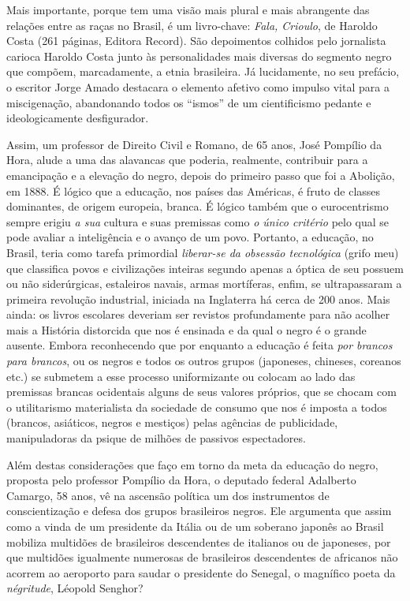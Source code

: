 \documentclass[
  letterpaper,
  DIV=11,
  numbers=noendperiod]{scrreprt}
\begin{document}
Mais importante, porque tem uma visão mais plural e mais abrangente das
relações entre as raças no Brasil, é um livro-chave: \emph{Fala,
Crioulo}, de Haroldo Costa (261 páginas, Editora Record). São
depoimentos colhidos pelo jornalista carioca Haroldo Costa junto às
personalidades mais diversas do segmento negro que compõem,
marcadamente, a etnia brasileira. Já lucidamente, no seu prefácio, o
escritor Jorge Amado destacara o elemento afetivo como impulso vital
para a miscigenação, abandonando todos os ``ismos'' de um cientificismo
pedante e ideologicamente desfigurador.

Assim, um professor de Direito Civil e Romano, de 65 anos, José Pompílio
da Hora, alude a uma das alavancas que poderia, realmente, contribuir
para a emancipação e a elevação do negro, depois do primeiro passo que
foi a Abolição, em 1888. É lógico que a educação, nos países das
Américas, é fruto de classes dominantes, de origem europeia, branca. É
lógico também que o eurocentrismo sempre erigiu \emph{a sua} cultura e
suas premissas como \emph{o único critério} pelo qual se pode avaliar a
inteligência e o avanço de um povo. Portanto, a educação, no Brasil,
teria como tarefa primordial \emph{liberar-se da obsessão tecnológica}
(grifo meu) que classifica povos e civilizações inteiras segundo apenas
a óptica de seu possuem ou não siderúrgicas, estaleiros navais, armas
mortíferas, enfim, se ultrapassaram a primeira revolução industrial,
iniciada na Inglaterra há cerca de 200 anos. Mais ainda: os livros
escolares deveriam ser revistos profundamente para não acolher mais a
História distorcida que nos é ensinada e da qual o negro é o grande
ausente. Embora reconhecendo que por enquanto a educação é feita
\emph{por brancos para brancos}, ou os negros e todos os outros grupos
(japoneses, chineses, coreanos etc.) se submetem a esse processo
uniformizante ou colocam ao lado das premissas brancas ocidentais alguns
de seus valores próprios, que se chocam com o utilitarismo materialista
da sociedade de consumo que nos é imposta a todos (brancos, asiáticos,
negros e mestiços) pelas agências de publicidade, manipuladoras da
psique de milhões de passivos espectadores.

Além destas considerações que faço em torno da meta da educação do
negro, proposta pelo professor Pompílio da Hora, o deputado federal
Adalberto Camargo, 58 anos, vê na ascensão política um dos instrumentos
de conscientização e defesa dos grupos brasileiros negros. Ele argumenta
que assim como a vinda de um presidente da Itália ou de um soberano
japonês ao Brasil mobiliza multidões de brasileiros descendentes de
italianos ou de japoneses, por que multidões igualmente numerosas de
brasileiros descendentes de africanos não acorrem ao aeroporto para
saudar o presidente do Senegal, o magnífico poeta da \emph{négritude},
Léopold Senghor?
\end{document}
